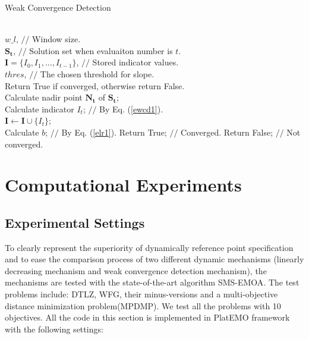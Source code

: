 \documentclass[conference]{IEEEtran}
\begin{document}
\begin{algorithm}
  \caption{Weak Convergence Detection}
  \label{alg:wcd}
  \begin{algorithmic}
  \REQUIRE ~~\\
    $w\_l$, $//$ Window size.\\
    $\boldsymbol{S_{t}}$, $//$ Solution set when evaluaiton number is $t$.\\
    $\boldsymbol I = \{I_{0},I_{1},\dots,I_{t-1}\}$, $//$ Stored indicator values. \\
    $thres$, $//$ The chosen threshold for slope. \\ 
  \ENSURE Return True if converged, otherwise return False.~~\\
    Calculate nadir point $\boldsymbol{N_{t}}$ of $\boldsymbol{S_{t}}$; \\
    Calculate indicator $I_{t}$; $//$ By Eq. (\ref{ewcd1}). \\
    $\boldsymbol I \gets \boldsymbol I \cup \{I_{t}\}$; \\
    \STATE Calculate $b$; $//$ By Eq. (\ref{elr1}).
      \STATE Return True; $//$ Converged.
      \ENDIF
    \ENDIF
    \STATE Return False; $//$ Not converged.
  \end{algorithmic}
\end{algorithm}
% 
% 
%
\section{Computational Experiments}
\subsection{Experimental Settings}
To clearly represent the superiority of dynamically reference point specification 
and to ease the comparison process of two different dynamic mechanisms
(linearly decreasing mechanism and weak convergence detection mechanism), 
the mechanisms are tested with the state-of-the-art algorithm SMS-EMOA\cite{smsemoa}.
The test problems include: 
DTLZ\cite{DTLZ}, WFG\cite{WFG}, their minus-versions\cite{minusTestProblem} 
and a multi-objective distance minimization problem(MPDMP)\cite{dmp}.
We test all the problems with 10 objectives. 
All the code in this section is implemented in PlatEMO framework\cite{PlatEMO} 
with the following settings:
\end{document}
